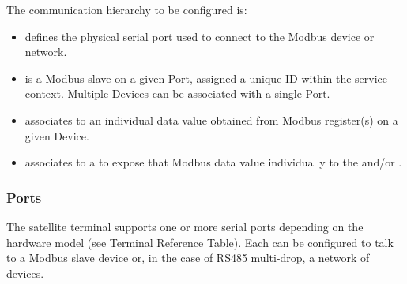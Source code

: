 \documentclass[letterpaper,10pt,english]{sphinxmanual}
\begin{document}
The communication hierarchy to be configured is:
\begin{itemize}
\item {} 
 defines the physical serial port used to connect to the Modbus device or network.

\item {} 
 is a Modbus slave on a given Port, assigned a unique ID within the service context.  Multiple Devices can be associated with a single Port.

\item {} 
 associates to an individual data value obtained from Modbus register(s) on a given Device.

\item {} 
  associates to a  to expose that Modbus data value individually to the  and/or .

\end{itemize}


\subsubsection{Ports}
\label{\detokenize{configuration:ports}}\label{\detokenize{configuration:id1}}
The satellite terminal supports one or more serial ports depending on the hardware model (see Terminal Reference Table). Each  can be configured to talk to a Modbus slave device or, in the case of RS485 multi-drop, a network of devices.
\end{document}
